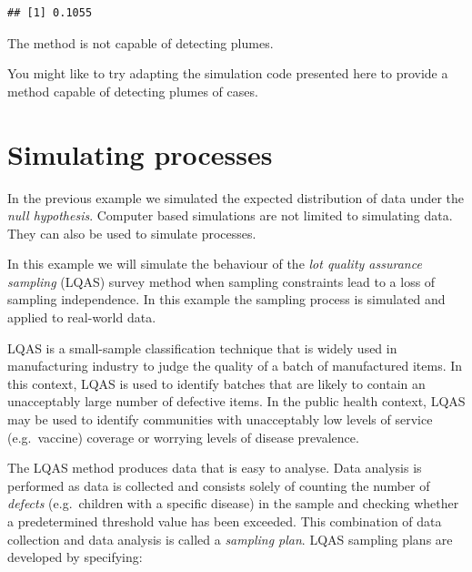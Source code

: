 \documentclass[12pt,a4paper]{book}
\theoremstyle{definition}
\theoremstyle{definition}
\theoremstyle{definition}
\theoremstyle{remark}
\begin{document}
\begin{verbatim}
## [1] 0.1055
\end{verbatim}

The method is not capable of detecting plumes.

You might like to try adapting the simulation code presented here to
provide a method capable of detecting plumes of cases.

\hypertarget{simulating-processes}{%
\section{Simulating processes}\label{simulating-processes}}

In the previous example we simulated the expected distribution of data
under the \emph{null hypothesis}. Computer based simulations are not
limited to simulating data. They can also be used to simulate processes.

In this example we will simulate the behaviour of the \emph{lot quality
assurance sampling} (LQAS) survey method when sampling constraints lead
to a loss of sampling independence. In this example the sampling process
is simulated and applied to real-world data.

LQAS is a small-sample classification technique that is widely used in
manufacturing industry to judge the quality of a batch of manufactured
items. In this context, LQAS is used to identify batches that are likely
to contain an unacceptably large number of defective items. In the
public health context, LQAS may be used to identify communities with
unacceptably low levels of service (e.g.~vaccine) coverage or worrying
levels of disease prevalence.

The LQAS method produces data that is easy to analyse. Data analysis is
performed as data is collected and consists solely of counting the
number of \emph{defects} (e.g.~children with a specific disease) in the
sample and checking whether a predetermined threshold value has been
exceeded. This combination of data collection and data analysis is
called a \emph{sampling plan}. LQAS sampling plans are developed by
specifying:
\end{document}
